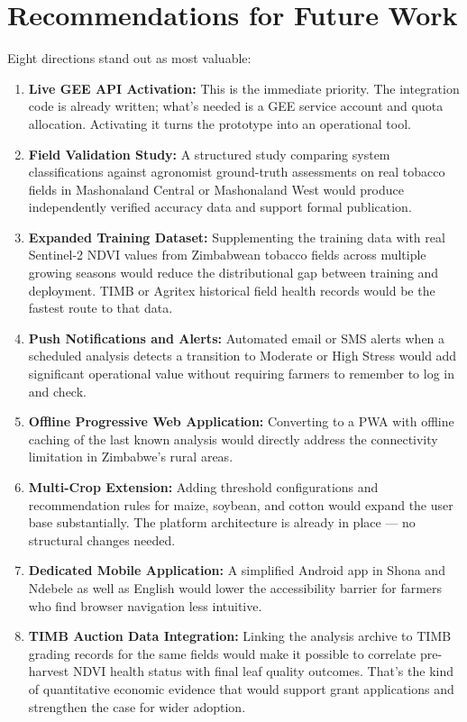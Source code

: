 \documentclass[12pt,a4paper]{report}
\begin{document}
\section{Recommendations for Future Work}

Eight directions stand out as most valuable:

\begin{enumerate}
  \item \textbf{Live GEE API Activation:} This is the immediate priority. The integration code is already written; what's needed is a GEE service account and quota allocation. Activating it turns the prototype into an operational tool.

  \item \textbf{Field Validation Study:} A structured study comparing system classifications against agronomist ground-truth assessments on real tobacco fields in Mashonaland Central or Mashonaland West would produce independently verified accuracy data and support formal publication.

  \item \textbf{Expanded Training Dataset:} Supplementing the training data with real Sentinel-2 NDVI values from Zimbabwean tobacco fields across multiple growing seasons would reduce the distributional gap between training and deployment. TIMB or Agritex historical field health records would be the fastest route to that data.

  \item \textbf{Push Notifications and Alerts:} Automated email or SMS alerts when a scheduled analysis detects a transition to Moderate or High Stress would add significant operational value without requiring farmers to remember to log in and check.

  \item \textbf{Offline Progressive Web Application:} Converting to a PWA with offline caching of the last known analysis would directly address the connectivity limitation in Zimbabwe's rural areas.

  \item \textbf{Multi-Crop Extension:} Adding threshold configurations and recommendation rules for maize, soybean, and cotton would expand the user base substantially. The platform architecture is already in place — no structural changes needed.

  \item \textbf{Dedicated Mobile Application:} A simplified Android app in Shona and Ndebele as well as English would lower the accessibility barrier for farmers who find browser navigation less intuitive.

  \item \textbf{TIMB Auction Data Integration:} Linking the analysis archive to TIMB grading records for the same fields would make it possible to correlate pre-harvest NDVI health status with final leaf quality outcomes. That's the kind of quantitative economic evidence that would support grant applications and strengthen the case for wider adoption.
\end{enumerate}
\end{document}
